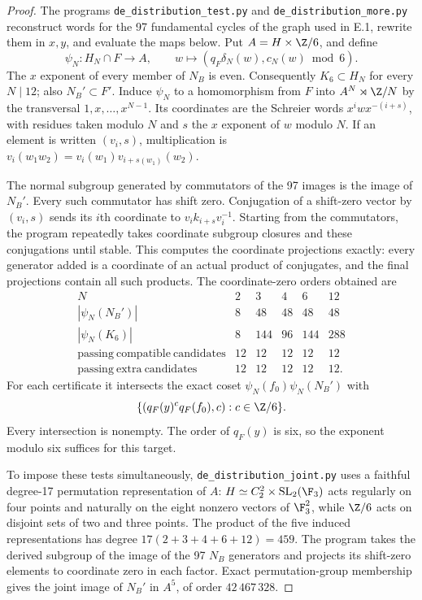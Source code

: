 \begin{proof}
The programs \texttt{de\_distribution\_test.py} and
\texttt{de\_distribution\_more.py} reconstruct words for the 97
fundamental cycles of the graph used in E.1, rewrite them in $x,y$,
and evaluate the maps below. Put $A=H\times\Z/6$, and define
\[
 \psi_N:H_N\cap F\to A,\qquad
 w\longmapsto(q_F\delta_N(w),c_N(w)\bmod6).
\]
The $x$ exponent of every member of $N_B$ is even. Consequently
$K_6\subset H_N$ for every $N\mid12$; also $N_B'\subset F'$.
Induce $\psi_N$ to a homomorphism from $F$ into
$A^N\rtimes\Z/N$ by the transversal $1,x,\ldots,x^{N-1}$.
Its coordinates are the Schreier words
$x^iwx^{-(i+s)}$, with residues taken modulo $N$ and
$s$ the $x$ exponent of $w$ modulo $N$.
If an element is written $(v_i,s)$, multiplication is
$v_i(w_1w_2)=v_i(w_1)v_{i+s(w_1)}(w_2)$.

The normal subgroup generated by commutators of the 97 images is
the image of $N_B'$. Every such commutator has shift zero.
Conjugation of a shift-zero vector by $(v_i,s)$ sends its $i$th
coordinate to $v_i k_{i+s}v_i^{-1}$. Starting from the commutators,
the program repeatedly takes coordinate subgroup closures and these
conjugations until stable. This computes the coordinate projections
exactly: every generator added is a coordinate of an actual product
of conjugates, and the final projections contain all such products.
The coordinate-zero orders obtained are
\[
\begin{array}{c|rrrrr}
 N&2&3&4&6&12\\\hline
 |\psi_N(N_B')|&8&48&48&48&48\\
 |\psi_N(K_6)|&8&144&96&144&288\\
 \mathrm{passing\ compatible\ candidates}&12&12&12&12&12\\
 \mathrm{passing\ extra\ candidates}&12&12&12&12&12.
\end{array}
\]
For each certificate it intersects the exact coset
$\psi_N(f_0)\psi_N(N_B')$ with
\[
 \{(q_F(y)^c q_F(f_0),c):c\in\Z/6\}.
\]
Every intersection is nonempty. The order of $q_F(y)$ is six,
so the exponent modulo six suffices for this target.

To impose these tests simultaneously, \texttt{de\_distribution\_joint.py}
uses a faithful degree-17 permutation representation of $A$:
$H\simeq C_2^2\times\mathrm{SL}_2(\F_3)$ acts regularly on four
points and naturally on the eight nonzero vectors of $\F_3^2$,
while $\Z/6$ acts on disjoint sets of two and three points.
The product of the five induced representations has degree
$17(2+3+4+6+12)=459$. The program takes the derived subgroup of
the image of the 97 $N_B$ generators and projects its shift-zero
elements to coordinate zero in each factor. Exact permutation-group
membership gives the joint image of $N_B'$ in $A^5$, of order
$42\,467\,328$.


\end{proof}
